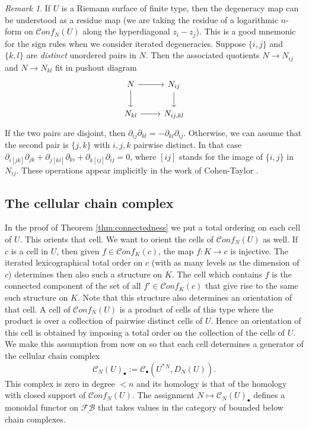\documentclass[12pt,letterpaper]{amsart}
\numberwithin{equation}{section}
\newcommand{\p}{\partial}
\newcommand\FB{\underline{\mathcal {F\!B}}}
\def\Cscr{{\mathscr C}}
\def\pt{{\scriptscriptstyle\bullet}}
\newcommand\conf{\mathscr{C}\!\mathit{onf}\!}
\theoremstyle{remark}
\newtheorem{remark}[theorem]{Remark}
\begin{document}
\begin{remark}\label{rem:}
If $U$ is a Riemann surface of finite type, then the degeneracy map can be understood as a residue map (we are taking the residue of a logarithmic  $n$-form on $\conf_N(U)$ along the hyperdiagonal $z_i-z_j$). This is a good mnemonic for the sign rules 
when we consider iterated degeneracies. Suppose $\{i,j\}$ and $\{k, l\}$ are \emph{distinct} unordered pairs in $N$. Then the associated  quotients  $N\to N_{ij}$ and  $N\to N_{kl}$ fit in pushout diagram
\[
 \begin{tikzcd}
    N\dar\rar &  N_{ij}\dar\\
   N_{kl}\rar &  N_{ij, kl}
\end{tikzcd}
\]
If the two pairs are disjoint, then  $\p_{ij}\p_{kl}=-\p_{kl}\p_{ij}$. Otherwise, we can assume that the second pair is $\{j, k\}$ with $i,j,k$ pairwise distinct.
In that case $\p_{i[jk]}\p_{jk}+\p_{j[ki]}\p_{ki}+\p_{k[ij]}\p_{ij}=0$, where $[ij]$ stands for the image of $\{i,j\}$ in $N_{ij}$. These operations appear implicitly  in the work of Cohen-Taylor \cite{cohen_taylor}.
\end{remark}

\subsection{The cellular  chain complex}

In the proof of Theorem \ref{thm:connectedness} we put a total ordering  on each  cell of $U$. This orients that cell. We want to orient the cells of $\conf_N(U)$ as well.  If $c$ is a cell in $U$, then
given  $f\in\conf_K(c)$, the map $f:K\to c$ is injective. The iterated   lexicographical  total order on $c$ (with as many levels as the dimension of $c$) determines then also such a structure on $K$. The cell which contains $f$ is the connected component of the set of all $f'\in\conf_K(c)$ that give rise to the same such structure on $K$. Note that this structure also  determines  an orientation of that cell. A cell of $\conf_N(U)$
is a product of cells of this type  where the product is over a  collection of pairwise distinct cells of $U$. Hence an orientation of this 
cell is obtained by imposing a total order on the collection of the cells of $U$. We make this assumption from now on so that each cell determines a generator of the cellular chain complex 
\[
\Cscr_N(U)_\pt:=\Cscr_\pt( U^*{}^N, D_N(U)).
\]
This complex is zero in degree $<n$ and its  homology is that of  the homology with closed support of  $\conf_N(U)$.
The assignment $N\mapsto \Cscr_N(U)_\pt$ defines a monoidal functor on $\FB$ that takes values  in the category of bounded below chain complexes.
\end{document}
